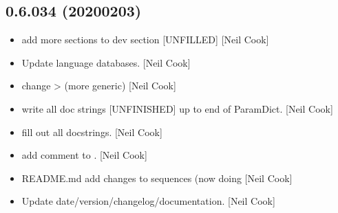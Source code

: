 \documentclass[a4paper,10pt,english]{report}
\begin{document}
\subsection{0.6.034 (2020\sphinxhyphen{}02\sphinxhyphen{}03)}
\label{\detokenize{misc/changelog:id4}}\begin{itemize}
\item {} 
 \sphinxhyphen{} add more sections to
dev section {[}UNFILLED{]} {[}Neil Cook{]}

\item {} 
Update language databases. {[}Neil Cook{]}

\item {} 
 \sphinxhyphen{} change  \textendash{}\textgreater{} 
(more generic) {[}Neil Cook{]}

\item {} 
 \sphinxhyphen{} write all doc strings {[}UNFINISHED{]}
up to end of ParamDict. {[}Neil Cook{]}

\item {} 
 \sphinxhyphen{} fill out all doc\sphinxhyphen{}strings. {[}Neil
Cook{]}

\item {} 
 \sphinxhyphen{} add comment to . {[}Neil Cook{]}

\item {} 
README.md \sphinxhyphen{} add changes to sequences (now doing  {[}Neil
Cook{]}

\item {} 
Update date/version/changelog/documentation. {[}Neil Cook{]}

\end{itemize}
\end{document}
